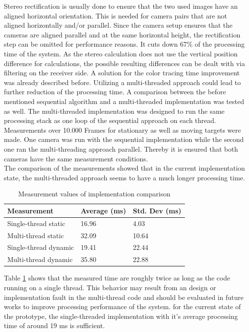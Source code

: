 Stereo rectification is usually done to ensure that the two used images have an aligned horizontal orientation. This is needed for camera pairs that are not aligned horizontally and/or parallel. Since the camera setup ensures that the cameras are aligned parallel and at the same horizontal height, the rectification step can be omitted for performance reasons. It cuts down 67\% of the processing time of the system. As the stereo calculation does not use the vertical position difference for calculations, the possible resulting differences can be dealt with via filtering on the receiver side.
A solution for the color tracing time improvement was already described before. Utilizing a multi-threaded approach could lead to further reduction of the processing time. A comparison between the before mentioned sequential algorithm and a multi-threaded implementation was tested as well. The multi-threaded implementation was designed to run the same processing stack as one loop of the sequential approach on each thread. Measurements over 10.000 Frames for stationary as well as moving targets were made. One camera was run with the sequential implementation while the second one ran the multi-threading approach parallel. Thereby it is ensured that both cameras have the same measurement conditions.\\
The comparison of the measurements showed that in the current implementation state, the multi-threaded approach seems to have a much longer processing time. 
\begin{table}[h]
\centering
\caption{Measurement values of implementation comparison}
\label{tbl:implementaion_comparison}
\begin{tabular}{|l|l|l|}
\hline
Measurement            & Average (ms) & Std. Dev (ms) \\ \hline
Single-thread static  & 16.96        & 4.03          \\ \hline
Multi-thread static   & 32.09        & 10.64         \\ \hline
Single-thread dynamic & 19.41        & 22.44         \\ \hline
Multi-thread dynamic  & 35.80        & 22.88         \\ \hline
\end{tabular}
\end{table}
Table \ref{tbl:implementaion_comparison} shows that the measured time are roughly twice as long as the code running on a single thread. This behavior may result from an design or implementation fault in the multi-thread code and should be evaluated in future works to improve processing performance of the system. for the current state of the prototype, the single-threaded implementation with it's average processing time of around 19 ms is sufficient.
